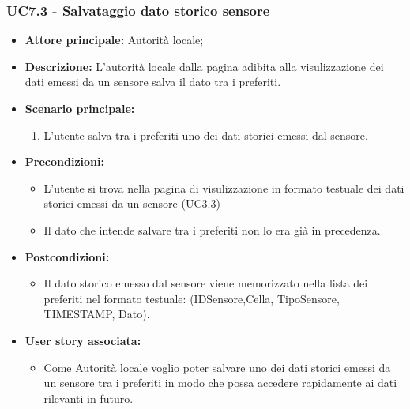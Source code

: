 \subsubsection{UC7.3 - Salvataggio dato storico sensore}
\begin{itemize}
    \item \textbf{Attore principale:} Autorità locale;
    \item \textbf{Descrizione:} L’autorità locale dalla pagina adibita alla visulizzazione dei dati emessi da un sensore salva il dato tra i preferiti.
    \item \textbf{Scenario principale:}
          \begin{enumerate}
              \item L'utente salva tra i preferiti uno dei dati storici emessi dal sensore.
          \end{enumerate}
    \item \textbf{Precondizioni:}
          \begin{itemize}
              \item  L'utente si trova nella pagina di visulizzazione in formato testuale dei dati storici emessi da un sensore (UC3.3)
              \item  Il dato che intende salvare tra i preferiti non lo era già in precedenza.
          \end{itemize}
    \item \textbf{Postcondizioni:}
          \begin{itemize}
              \item  Il dato storico emesso dal sensore viene memorizzato nella lista dei preferiti nel formato testuale: (IDSensore,Cella, TipoSensore,
                    TIMESTAMP, Dato).
          \end{itemize}
    \item \textbf{User story associata:}
          \begin{itemize}
              \item Come Autorità locale voglio poter salvare uno dei dati storici emessi da un sensore tra i preferiti in modo che possa accedere rapidamente ai dati rilevanti in futuro.
          \end{itemize}
\end{itemize}
